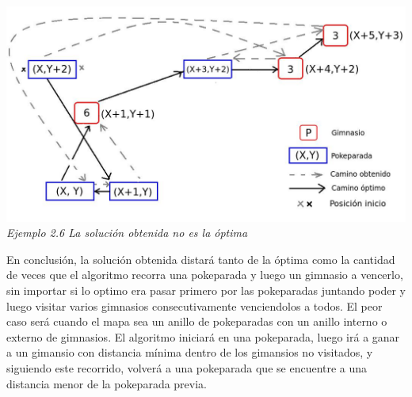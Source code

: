 \vspace*{0.3cm} \vspace*{0.3cm}
  \begin{center}
\includegraphics[scale=0.60]{./EJ2/nooptima2.jpeg}
\\{\textit{Ejemplo 2.6 La soluci\'on obtenida no es la \'optima}}
  \end{center}
  \vspace*{0.3cm}


En conclusi\'on, la soluci\'on obtenida distará tanto de la óptima como la cantidad de veces que el algoritmo recorra una pokeparada y luego un gimnasio a vencerlo, sin importar si lo optimo era pasar primero por las pokeparadas juntando poder y luego visitar varios gimnasios consecutivamente venciendolos a todos.
El peor caso será cuando el mapa sea un anillo de pokeparadas con un anillo interno o externo de gimnasios. 
El algoritmo iniciará en una pokeparada, luego irá a ganar a un gimansio con distancia mínima dentro de los gimansios no visitados, y siguiendo este recorrido, volverá a una pokeparada que se encuentre a una distancia menor de la pokeparada previa.\\



